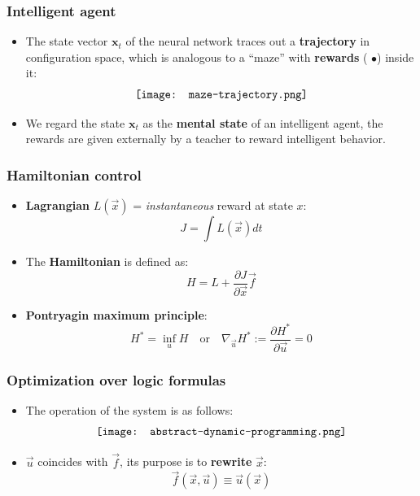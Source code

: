 \documentclass[17pt]{beamer}
\newcommand{\vect}[1]{\boldsymbol{#1}}
\begin{document}
\begin{frame}
\frametitle{Intelligent agent}
\begin{itemize}
	\item The state vector $\vect{x}_t$ of the neural network traces out a \textbf{trajectory} in configuration space, which is analogous to a ``maze'' with \textbf{rewards} ({\color{red} $\bullet$}) inside it:
	\begin{equation}
	\vcenter{\hbox{\texttt{[image: maze-trajectory.png]}}}
	\end{equation}

	\item We regard the state $\vect{x}_t$ as the \textbf{mental state} of an intelligent agent, the rewards are given externally by a teacher to reward intelligent behavior.
\end{itemize}
\end{frame}

\begin{frame}
\frametitle{Hamiltonian control}
\begin{itemize}
	\item \textbf{Lagrangian} $L(\vec{x})$ = \textit{instantaneous} reward at state $x$:
	\begin{equation}
	J = \int L(\vec{x}) dt
	\end{equation}
	\item The \textbf{Hamiltonian} is defined as:
	\begin{equation}
	H = L + \frac{\partial J}{\partial \vec{x}} \vec{f}
	\end{equation}
	\item \textbf{Pontryagin maximum principle}:
	\begin{equation}
	\label{Pontryagin-max-principle}
	H^* = \inf_u H \quad \mbox{or} \quad \nabla_{\vec{u}} H^* := \frac{\partial H^*}{\partial \vec{u}} = 0
	\end{equation}
\end{itemize}
\end{frame}

\begin{frame}
\frametitle{Optimization over logic formulas}
\begin{itemize}
	\item The operation of the system is as follows:
	\begin{equation}
	\vcenter{\hbox{\texttt{[image: abstract-dynamic-programming.png]}}}
	\end{equation}
	\item $\vec{u}$ coincides with $\vec{f}$, its purpose is to \textbf{rewrite} $\vec{x}$:
	\begin{equation}
	\vec{f}(\vec{x},\vec{u}) \equiv \vec{u}(\vec{x})
	\end{equation}
\end{itemize}
\end{frame}
\end{document}
